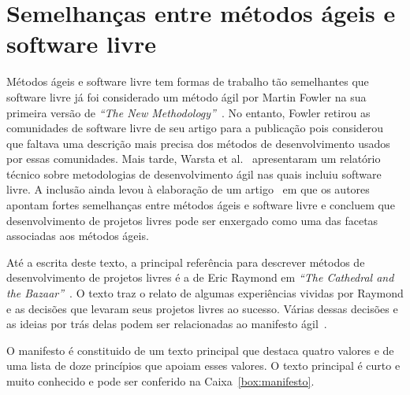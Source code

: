 \chapter{Semelhanças entre métodos ágeis e software livre}
\label{cap:semelhancas}

Métodos ágeis e software livre tem formas de trabalho tão semelhantes
que software livre já foi considerado um método ágil por Martin Fowler
na sua primeira versão de \emph{``The New
  Methodology''}~\cite{Fowler00orig}. No entanto, Fowler retirou as
comunidades de software livre de seu artigo para a publicação pois
considerou que faltava uma descrição mais precisa dos métodos de
desenvolvimento usados por essas comunidades. Mais tarde, Warsta et
al.~\cite{Warsta2002} apresentaram um relatório técnico sobre
metodologias de desenvolvimento ágil nas quais incluiu software
livre. A inclusão ainda levou à elaboração de um
artigo~\cite{Warsta2003} em que os autores apontam fortes semelhanças
entre métodos ágeis e software livre e concluem que desenvolvimento de
projetos livres pode ser enxergado como uma das facetas associadas aos
métodos ágeis.

Até a escrita deste texto, a principal referência para descrever
métodos de desenvolvimento de projetos livres é a de Eric Raymond em
\emph{``The Cathedral and the Bazaar''}~\cite{Raymond1999}. O texto
traz o relato de algumas experiências vividas por Raymond e as
decisões que levaram seus projetos livres ao sucesso. Várias dessas
decisões e as ideias por trás delas podem ser relacionadas ao
manifesto ágil~\cite{AgileManifesto}.

O manifesto é constituido de um texto principal que destaca quatro
valores e de uma lista de doze princípios que apoiam esses valores. O
texto principal é curto e muito conhecido e pode ser conferido na
Caixa~\ref{box:manifesto}.

